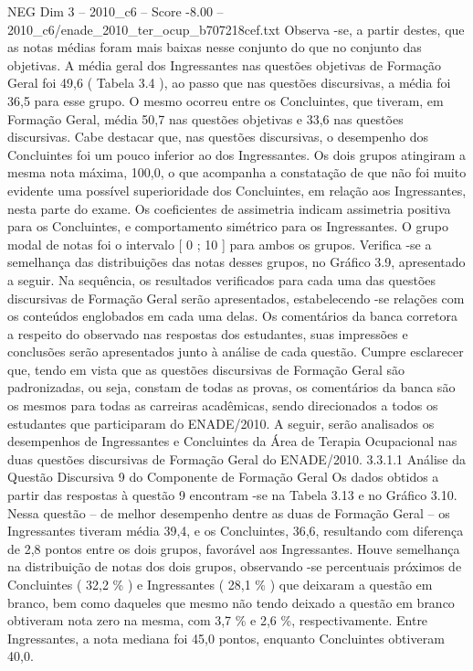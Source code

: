 \begin{textsample}{NEG Dim 3 – 2010\_c6 – Score -8.00 – 2010\_c6/enade\_2010\_ter\_ocup\_b707218cef.txt}
Observa -se, a partir destes, que as notas médias foram mais baixas nesse conjunto do que no conjunto das objetivas.
A média geral dos Ingressantes nas questões objetivas de Formação Geral foi 49,6 ( Tabela 3.4 ), ao passo que nas questões discursivas, a média foi 36,5 para esse grupo.
O mesmo ocorreu entre os Concluintes, que tiveram, em Formação Geral, média 50,7 nas questões objetivas e 33,6 nas questões discursivas.
Cabe destacar que, nas questões discursivas, o desempenho dos Concluintes foi um pouco inferior ao dos Ingressantes.
Os dois grupos atingiram a mesma nota máxima, 100,0, o que acompanha a constatação de que não foi muito evidente uma possível superioridade dos Concluintes, em relação aos Ingressantes, nesta parte do exame.
Os coeficientes de assimetria indicam assimetria positiva para os Concluintes, e comportamento simétrico para os Ingressantes.
O grupo modal de notas foi o intervalo [ 0 ; 10 ] para ambos os grupos.
Verifica -se a semelhança das distribuições das notas desses grupos, no Gráfico 3.9, apresentado a seguir.
Na sequência, os resultados verificados para cada uma das questões discursivas de Formação Geral serão apresentados, estabelecendo -se relações com os conteúdos englobados em cada uma delas.
Os comentários da banca corretora a respeito do observado nas respostas dos estudantes, suas impressões e conclusões serão apresentados junto à análise de cada questão.
Cumpre esclarecer que, tendo em vista que as questões discursivas de Formação Geral são padronizadas, ou seja, constam de todas as provas, os comentários da banca são os mesmos para todas as carreiras acadêmicas, sendo direcionados a todos os estudantes que participaram do ENADE/2010.
A seguir, serão analisados os desempenhos de Ingressantes e Concluintes da Área de Terapia Ocupacional nas duas questões discursivas de Formação Geral do ENADE/2010. 3.3.1.1 Análise da Questão Discursiva 9 do Componente de Formação Geral Os dados obtidos a partir das respostas à questão 9 encontram -se na Tabela 3.13 e no Gráfico 3.10.
Nessa questão – de melhor desempenho dentre as duas de Formação Geral – os Ingressantes tiveram média 39,4, e os Concluintes, 36,6, resultando com diferença de 2,8 pontos entre os dois grupos, favorável aos Ingressantes.
Houve semelhança na distribuição de notas dos dois grupos, observando -se percentuais próximos de Concluintes ( 32,2 \% ) e Ingressantes ( 28,1 \% ) que deixaram a questão em branco, bem como daqueles que mesmo não tendo deixado a questão em branco obtiveram nota zero na mesma, com 3,7 \% e 2,6 \%, respectivamente.
Entre Ingressantes, a nota mediana foi 45,0 pontos, enquanto Concluintes obtiveram 40,0.

\end{textsample}
